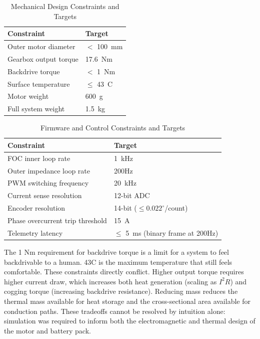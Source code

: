 \documentclass[11pt]{article}
\begin{document}
\begin{table}[H]
\centering
\caption{Mechanical Design Constraints and Targets}
\label{tab:constraints}
\begin{tabular}{ll}
\toprule
\textbf{Constraint} & \textbf{Target} \\
\midrule
Outer motor diameter & $<$ 100~mm \\
Gearbox output torque & 17.6~Nm \\
Backdrive torque & $<$ 1~Nm \\
Surface temperature & $\leq$ 43~\textdegree{}C \\
Motor weight & 600~g \\
Full system weight & 1.5~kg \\
\bottomrule
\end{tabular}
\end{table}

\begin{table}[H]
\centering
\caption{Firmware and Control Constraints and Targets}
\label{tab:fw_constraints}
\begin{tabular}{ll}
\toprule
\textbf{Constraint} & \textbf{Target} \\
\midrule
FOC inner loop rate & 1~kHz \\
Outer impedance loop rate & 200Hz \\
PWM switching frequency & 20~kHz \\
Current sense resolution & 12-bit ADC \\
Encoder resolution & 14-bit ($\leq 0.022^\circ$/count) \\
Phase overcurrent trip threshold & 15~A \\
Telemetry latency & $\leq$ 5~ms (binary frame at 200Hz) \\
\bottomrule
\end{tabular}
\end{table}

The 1 Nm requirement for backdrive torque is a limit for a system to feel backdrivable to a human. 43C is the maximum temperature that still feels comfortable. These constraints directly conflict. Higher output torque requires higher current draw, which increases both heat generation (scaling as $I^2 R$) and cogging torque (increasing backdrive resistance). Reducing mass reduces the thermal mass available for heat storage and the cross-sectional area available for conduction paths. These tradeoffs cannot be resolved by intuition alone: simulation was required to inform both the electromagnetic and thermal design of the motor and battery pack.
\end{document}
